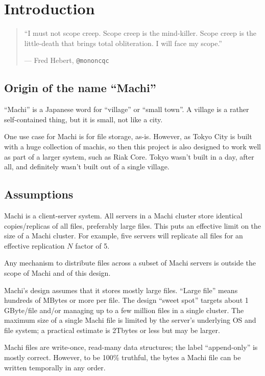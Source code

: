 \documentclass[preprint,10pt]{sigplanconf}
\begin{document}
\section{Introduction}
\label{sec:introduction}

\begin{quotation}
``I must not scope creep. Scope creep is the mind-killer. Scope creep
  is the little-death that brings total obliteration. I will face my
  scope.''
\par 
\hfill{--- Fred Hebert, {\tt @mononcqc}}
\end{quotation}
\subsection{Origin of the name ``Machi''}
\label{sub:name}

``Machi'' is a Japanese word for
``village'' or ``small town''.  A village is a rather self-contained
thing, but it is small, not like a city.

One use case for Machi is for file storage, as-is.  However, as Tokyo
City is built with a huge collection of machis, so then this project
is also designed to work well as part of a larger system, such as Riak
Core.  Tokyo wasn't built in a day, after all, and definitely wasn't
built out of a single village.

\subsection{Assumptions}
\label{sub:assumptions}

Machi is a client-server system.  All servers in a Machi cluster store
identical copies/replicas of all files, preferably large files.
This puts an effective limit on the size of a Machi cluster.
For example, five servers will replicate all files
for an effective replication $N$ factor of 5.

Any mechanism to distribute files across a subset of Machi
servers is outside the scope of Machi and of this design.

Machi's design assumes that it stores mostly large files.
``Large file'' means hundreds of MBytes or more
per file.  The design ``sweet spot'' targets about
1 GByte/file and/or managing up to a few million files in a
single cluster.  The maximum size of a single Machi file is
limited by the server's underlying OS and file system; a
practical estimate is 2Tbytes or less but may be larger.

Machi files are write-once, read-many data structures; the label
``append-only'' is mostly correct.  However, to be 100\% truthful,
the bytes a Machi file can be written temporally in any order.
\end{document}
